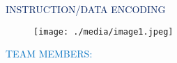 \documentclass[12pt]{article}
\begin{document}
\begin{Center}
{\fontsize{28pt}{33.6pt}\selectfont \textcolor[HTML]{002060}{INSTRUCTION/DATA ENCODING}\par}
\end{Center}\par




\begin{figure}[H]
	\begin{Center}
		\texttt{[image: ./media/image1.jpeg]}
	\end{Center}
\end{figure}



\par


\vspace{\baselineskip}

\vspace{\baselineskip}

\vspace{\baselineskip}

\vspace{\baselineskip}
{\fontsize{36pt}{43.2pt}\selectfont \textcolor[HTML]{0070C0}{TEAM MEMBERS:}\par}\par
\end{document}
